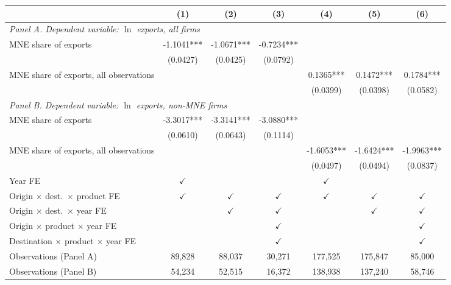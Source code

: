 \begin{tabular}{lcccccc} \hline
 & (1) & (2) & (3) & (4) & (5) & (6) \\ \hline
\multicolumn{7}{l}{\textit{Panel A. Dependent variable: $\ln$ exports, all firms}} \\
MNE share of exports & -1.1041*** & -1.0671*** & -0.7234*** &  &  &  \\
 & (0.0427) & (0.0425) & (0.0792) &  &  &  \\
MNE share of exports, all observations &  &  &  & 0.1365*** & 0.1472*** & 0.1784*** \\
 &  &  &  & (0.0399) & (0.0398) & (0.0582) \\
\midrule
\multicolumn{7}{l}{\textit{Panel B. Dependent variable: $\ln$ exports, non-MNE firms}} \\
MNE share of exports & -3.3017*** & -3.3141*** & -3.0880*** &  &  &  \\
 & (0.0610) & (0.0643) & (0.1114) &  &  &  \\
MNE share of exports, all observations &  &  &  & -1.6053*** & -1.6424*** & -1.9963*** \\
 &  &  &  & (0.0497) & (0.0494) & (0.0837) \\
\hline
Year FE & $\checkmark$ &  &  & $\checkmark$ &  &  \\
Origin $\times$ dest.\ $\times$ product FE & $\checkmark$ & $\checkmark$ & $\checkmark$ & $\checkmark$ & $\checkmark$ & $\checkmark$ \\
Origin $\times$ dest.\ $\times$ year FE &  & $\checkmark$ & $\checkmark$ &  & $\checkmark$ & $\checkmark$ \\
Origin $\times$ product $\times$ year FE &  &  & $\checkmark$ &  &  & $\checkmark$ \\
Destination $\times$ product $\times$ year FE &  &  & $\checkmark$ &  &  & $\checkmark$ \\
Observations (Panel A) & 89,828 & 88,037 & 30,271 & 177,525 & 175,847 & 85,000 \\
Observations (Panel B) & 54,234 & 52,515 & 16,372 & 138,938 & 137,240 & 58,746 \\
\hline
\end{tabular}
